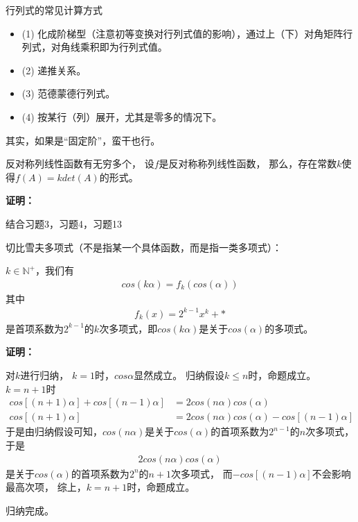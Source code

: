 \documentclass{article}
\begin{document}
\begin{zremark}
  行列式的常见计算方式
\end{zremark}

\begin{itemize}
  \item (1) 化成阶梯型（注意初等变换对行列式值的影响），通过上（下）对角矩阵行列式，对角线乘积即为行列式值。
  \item (2) 递推关系。
  \item (3) 范德蒙德行列式。
  \item (4) 按某行（列）展开，尤其是零多的情况下。
\end{itemize}

其实，如果是“固定阶”，蛮干也行。

\begin{zremark}
  反对称列线性函数有无穷多个，
  设$f$是反对称称列线性函数，
  那么，存在常数$k$使得$f (A) = k det(A)$的形式。
\end{zremark}

\textbf{证明：}

结合习题3，习题4，习题13

\begin{zremark}
  切比雪夫多项式（不是指某一个具体函数，而是指一类多项式）：

  $k \in \mathbb{N}^{+}$，我们有
  \begin{align*}
    cos(k \alpha) = f_k (cos(\alpha))
  \end{align*}
  其中
  \begin{align*}
    f_k (x) = 2^{k - 1} x^k + *
  \end{align*}
  是首项系数为$2^{k - 1}$的$k$次多项式，即$cos(k \alpha)$是关于$cos(\alpha)$的多项式。
\end{zremark}

\textbf{证明：}

对$k$进行归纳，
$k = 1$时，$cos \alpha$显然成立。
归纳假设$k \leq n$时，命题成立。
$k = n+1$时
\begin{align*}
  cos[(n + 1)\alpha] + cos [(n - 1)\alpha]
                     & = 2 cos(n \alpha)cos(\alpha)                       \\
  cos[(n + 1)\alpha] & = 2 cos(n \alpha)cos(\alpha) - cos [(n - 1)\alpha]
\end{align*}
于是由归纳假设可知，$cos(n \alpha)$是关于$cos(\alpha)$的首项系数为$2^{n - 1}$的$n$次多项式，
于是
\begin{align*}
  2 cos(n \alpha)cos(\alpha)
\end{align*}
是关于$cos(\alpha)$的首项系数为$2^{n}$的$n+1$次多项式，
而$ - cos [(n - 1)\alpha]$不会影响最高次项，
综上，$k = n + 1$时，命题成立。

归纳完成。
\end{document}
